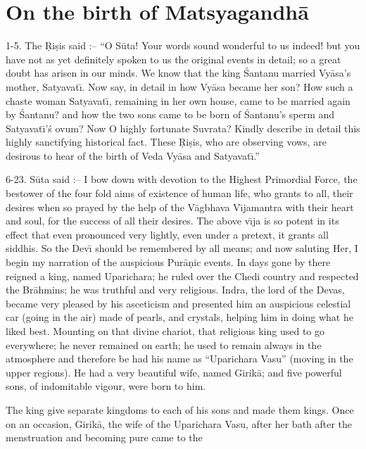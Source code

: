 \chapter{On the birth of Matsyagandh\=a}

1-5. The \d{R}i\d{s}is said :-- ``O S\=uta! Your words sound wonderful to us indeed! but you have not as yet definitely spoken to us the original events in detail; so a great doubt has arisen in our minds. We know that the king \'Santanu married Vy\=asa's mother, Satyavat\={\i}. Now say, in detail in how Vy\=asa became her son? How such a chaste woman Satyavat\={\i}, remaining in her own house, came to be married again by \'Santanu? and how the two sons came to be born of \'Santanu's sperm and Satyavat\={\i}'\'s ovum? Now O highly fortunate Suvrata? Kindly describe in detail this highly sanctifying historical fact. These \d{R}i\d{s}is, who are observing vows, are desirous to hear of the birth of Veda Vy\=asa and Satyavat\={\i}.''

6-23. S\=uta said :-- I bow down with devotion to the Highest Primordial Force, the bestower of the four fold aims of existence of human life, who grants to all, their desires when so prayed by the help of the V\=agbhava V\={\i}jamantra with their heart and soul, for the success of all their desires. The above v\={\i}ja is so potent in its effect that even pronounced very lightly, even under a pretext, it grants all siddhis. So the Dev\={\i} should be remembered by all means; and now saluting Her, I begin my narration of the auspicious Pur\=a\d{n}ic events. In days gone by there reigned a king, named Uparichara; he ruled over the Chedi country and respected the Br\=ahmins; he was truthful and very religious. Indra, the lord of the Devas, became very pleased by his asceticism and presented him an auspicious celestial car (going in the air) made of pearls, and crystals, helping him in doing what he liked best. Mounting on that divine chariot, that religious king used to go everywhere; he never remained on earth; he used to remain always in the atmosphere and therefore be had his name as ``Uparichara Vasu'' (moving in the upper regions). He had a very beautiful wife, named Girik\=a; and five powerful sons, of indomitable vigour, were born to him.

The king give separate kingdoms to each of his sons and made them kings. Once on an occasion, Girik\=a, the wife of the Uparichara Vasu, after her bath after the menstruation and becoming pure came to the

